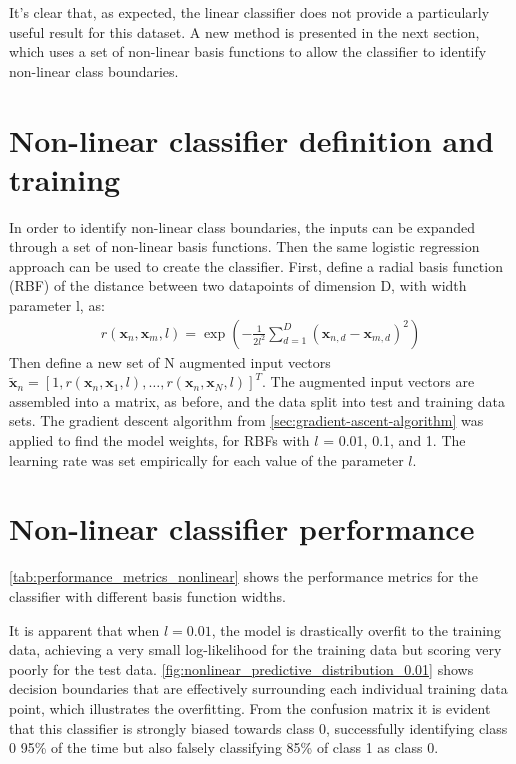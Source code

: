 \documentclass[a4paper]{article}
\begin{document}
    It's clear that, as expected, the linear classifier does not provide a particularly useful result for this dataset.
    A new method is presented in the next section, which uses a set of non-linear basis functions to allow the classifier to
    identify non-linear class boundaries.

    \section{Non-linear classifier definition and training}\label{sec:nonlinear-classifier}
    In order to identify non-linear class boundaries, the inputs can be expanded through a set of non-linear basis functions.
    Then the same logistic regression approach can be used to create the classifier.
    First, define a radial basis function (RBF) of the distance between two datapoints of dimension D, with width parameter l, as:
    \begin{align*}
        r(\textbf{x}_n, \textbf{x}_m, l) = \exp \left(-\frac{1}{2l^2} \sum_{d=1}^D (\textbf{x}_{n, d} - \textbf{x}_{m, d})^2 \right)
    \end{align*}
    Then define a new set of N augmented input vectors $\tilde{\textbf{x}}_n = [1, r(\textbf{x}_n, \textbf{x}_1, l), \dots, r(\textbf{x}_n, \textbf{x}_N, l)]^T$.
    The augmented input vectors are assembled into a matrix, as before, and the data split into test and training data sets.
    The gradient descent algorithm from \autoref{sec:gradient-ascent-algorithm} was applied to find the model weights,
    for RBFs with $l$ = 0.01, 0.1, and 1.
    The learning rate was set empirically for each value of the parameter $l$.

    \section{Non-linear classifier performance}\label{sec:nonlinear-performance}

    \autoref{tab:performance_metrics_nonlinear} shows the performance metrics for the classifier with different basis
    function widths.

    It is apparent that when $l = 0.01$, the model is drastically overfit to the training data, achieving
    a very small log-likelihood for the training data but scoring very poorly for the test data. \autoref{fig:nonlinear_predictive_distribution_0.01}
    shows decision boundaries that are effectively surrounding each individual training data point, which
    illustrates the overfitting.
    From the confusion matrix it is evident that this classifier is strongly biased towards class 0, successfully identifying class 0 95\% of the time
    but also falsely classifying 85\% of class 1 as class 0.
\end{document}

